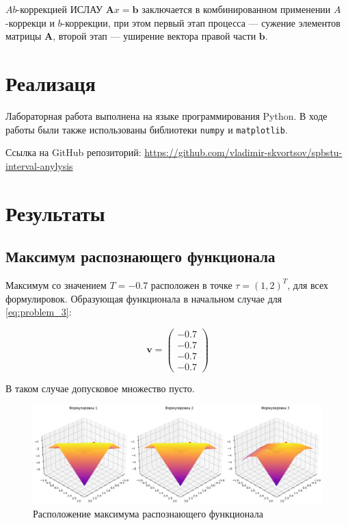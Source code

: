 \documentclass{article}
\begin{document}
  \( Ab \)-коррекцией ИСЛАУ \( \mathbf{A}x = \mathbf{b} \) заключается
  в комбинированном применении \( A \)-коррекци и \( b \)-коррекции,
  при этом первый этап процесса --- сужение элементов матрицы
  \( \mathbf{A} \), второй этап --- уширение вектора правой части
  \( \mathbf{b} \).

  \section{Реализаця}

  Лабораторная работа выполнена на языке программирования Python. В ходе
  работы были также использованы библиотеки \verb!numpy! и
  \verb!matplotlib!.

  Ссылка на GitHub репозиторий:
  \href{https://github.com/vladimir-skvortsov/spbstu-interval-anylysis}
  {https://github.com/vladimir-skvortsov/spbstu-interval-anylysis}

  \clearpage

  \section{Результаты}

  \subsection{Максимум распознающего функционала}

  Максимум со значением \( T = -0.7 \) расположен в точке
  \( \tau = (1, 2)^T \), для всех формулировок. Образующая функционала в
  начальном случае для \ref{eq:problem_3}:

  \begin{equation}
    \mathbf{v} = \begin{pmatrix}
      -0.7 \\
      -0.7 \\
      -0.7 \\
      -0.7
    \end{pmatrix}
  \end{equation}

  В таком случае допусковое множество пусто.

  \begin{figure}[htbp!]
		\begin{center}
			\includegraphics[width = \textwidth]{tol}
			\caption{Расположение максимума распознающего функционала}
      \label{figure:tol}
		\end{center}
	\end{figure}
\end{document}
